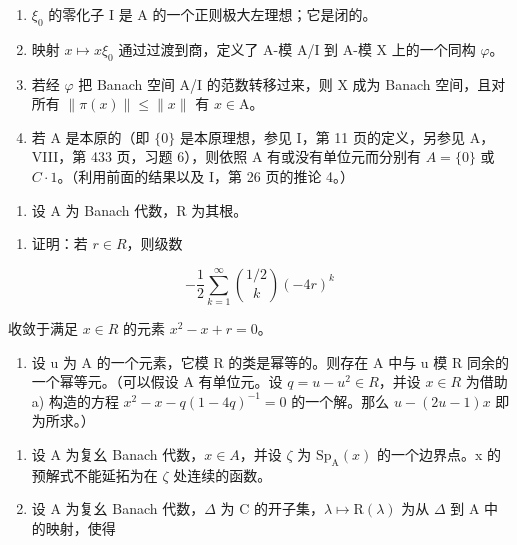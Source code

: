 \begin{enumerate}
\def\labelenumi{\alph{enumi})}
\item
  \(\xi_0\) 的零化子 I 是 A 的一个正则极大左理想；它是闭的。
\item
  映射 \(x \mapsto x\xi_{0}\) 通过过渡到商，定义了 A-模 A/I 到 A-模 X 上的一个同构 \(\varphi\)。
\item
  若经 \(\varphi\) 把 Banach 空间 A/I 的范数转移过来，则 X 成为 Banach 空间，且对所有 \(\| \pi (x)\| \leqslant \| x\|\) 有 \(x\in \mathrm{A}\)。
\item
  若 A 是本原的（即 \(\{0\}\) 是本原理想，参见 I，第 11 页的定义，另参见 A，VIII，第 433 页，习题 6），则依照 A 有或没有单位元而分别有 \(A = \{0\}\) 或 \(C \cdot 1\)。（利用前面的结果以及 I，第 26 页的推论 4。）
\end{enumerate}

\begin{enumerate}
\def\labelenumi{¶ \arabic{enumi})}
\setcounter{enumi}{25}
\tightlist
\item
  设 A 为 Banach 代数，R 为其根。
\end{enumerate}

\begin{enumerate}
\def\labelenumi{\alph{enumi})}
\tightlist
\item
  证明：若 \(r \in R\)，则级数
\end{enumerate}

\[
- \frac {1}{2} \sum_ {k = 1} ^ {\infty} \binom{1 / 2}{k} (- 4 r) ^ {k}
\]

收敛于满足 \(x \in R\) 的元素 \(x^{2} - x + r = 0\)。

\begin{enumerate}
\def\labelenumi{\alph{enumi})}
\setcounter{enumi}{1}
\tightlist
\item
  设 u 为 A 的一个元素，它模 R 的类是幂等的。则存在 A 中与 u 模 R 同余的一个幂等元。（可以假设 A 有单位元。设 \(q = u - u^{2} \in R\)，并设 \(x \in R\) 为借助 a) 构造的方程 \(x^{2} - x - q(1 - 4q)^{-1} = 0\) 的一个解。那么 \(u - (2u - 1)x\) 即为所求。）
\end{enumerate}

\begin{enumerate}
\def\labelenumi{\arabic{enumi})}
\setcounter{enumi}{26}
\item
  设 A 为复幺 Banach 代数，\(x \in A\)，并设 \(\zeta\) 为 \(\mathrm{Sp}_{\mathrm{A}}(x)\) 的一个边界点。x 的预解式不能延拓为在 \(\zeta\) 处连续的函数。
\item
  设 A 为复幺 Banach 代数，\(\Delta\) 为 C 的开子集，\(\lambda \mapsto \mathrm{R}(\lambda)\) 为从 \(\Delta\) 到 A 中的映射，使得
\end{enumerate}

